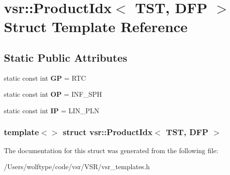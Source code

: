 \hypertarget{structvsr_1_1_product_idx_3_01_t_s_t_00_01_d_f_p_01_4}{\section{vsr\-:\-:Product\-Idx$<$ T\-S\-T, D\-F\-P $>$ Struct Template Reference}
\label{structvsr_1_1_product_idx_3_01_t_s_t_00_01_d_f_p_01_4}
}
\subsection*{Static Public Attributes}
\begin{DoxyCompactItemize}
\item 
\hypertarget{structvsr_1_1_product_idx_3_01_t_s_t_00_01_d_f_p_01_4_ab387fb4233ead7781ea24e035cdf9437}{static const int {\bfseries G\-P} = R\-T\-C}\label{structvsr_1_1_product_idx_3_01_t_s_t_00_01_d_f_p_01_4_ab387fb4233ead7781ea24e035cdf9437}

\item 
\hypertarget{structvsr_1_1_product_idx_3_01_t_s_t_00_01_d_f_p_01_4_ae77164920d387b2624299001ede55a83}{static const int {\bfseries O\-P} = I\-N\-F\-\_\-\-S\-P\-H}\label{structvsr_1_1_product_idx_3_01_t_s_t_00_01_d_f_p_01_4_ae77164920d387b2624299001ede55a83}

\item 
\hypertarget{structvsr_1_1_product_idx_3_01_t_s_t_00_01_d_f_p_01_4_ad5e2fb281653042457b3669df7df9ee6}{static const int {\bfseries I\-P} = L\-I\-N\-\_\-\-P\-L\-N}\label{structvsr_1_1_product_idx_3_01_t_s_t_00_01_d_f_p_01_4_ad5e2fb281653042457b3669df7df9ee6}

\end{DoxyCompactItemize}
\subsubsection*{template$<$$>$ struct vsr\-::\-Product\-Idx$<$ T\-S\-T, D\-F\-P $>$}



The documentation for this struct was generated from the following file\-:\begin{DoxyCompactItemize}
\item 
/\-Users/wolftype/code/vsr/\-V\-S\-R/vsr\-\_\-templates.\-h\end{DoxyCompactItemize}
